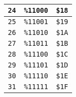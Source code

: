 \begin{multicols}{2}
\begin{center}
\begin{tabular}{|c|c|c|}
  \texttt{24} & \texttt{\%11000} &  \texttt{\$18} \\ \hline
  \texttt{25} & \texttt{\%11001} &  \texttt{\$19} \\ \hline
  \texttt{26} & \texttt{\%11010} &  \texttt{\$1A} \\ \hline
  \texttt{27} & \texttt{\%11011} &  \texttt{\$1B} \\ \hline
  \texttt{28} & \texttt{\%11100} &  \texttt{\$1C} \\ \hline
  \texttt{29} & \texttt{\%11101} &  \texttt{\$1D} \\ \hline
  \texttt{30} & \texttt{\%11110} &  \texttt{\$1E} \\ \hline
  \texttt{31} & \texttt{\%11111} &  \texttt{\$1F} \\ \hline
  	\end{tabular}
  \end{center}
  

\end{multicols}
